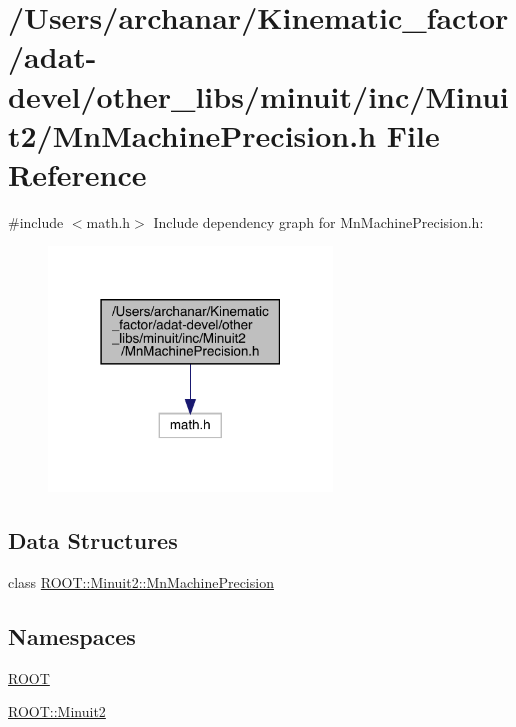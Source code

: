 \hypertarget{adat-devel_2other__libs_2minuit_2inc_2Minuit2_2MnMachinePrecision_8h}{}\section{/\+Users/archanar/\+Kinematic\+\_\+factor/adat-\/devel/other\+\_\+libs/minuit/inc/\+Minuit2/\+Mn\+Machine\+Precision.h File Reference}
\label{adat-devel_2other__libs_2minuit_2inc_2Minuit2_2MnMachinePrecision_8h}
{\ttfamily \#include $<$math.\+h$>$}\newline
Include dependency graph for Mn\+Machine\+Precision.\+h\+:
\nopagebreak
\begin{figure}[H]
\begin{center}
\leavevmode
\includegraphics[width=214pt]{d3/de6/adat-devel_2other__libs_2minuit_2inc_2Minuit2_2MnMachinePrecision_8h__incl}
\end{center}
\end{figure}
\subsection*{Data Structures}
\begin{DoxyCompactItemize}
\item 
class \mbox{\hyperlink{classROOT_1_1Minuit2_1_1MnMachinePrecision}{R\+O\+O\+T\+::\+Minuit2\+::\+Mn\+Machine\+Precision}}
\end{DoxyCompactItemize}
\subsection*{Namespaces}
\begin{DoxyCompactItemize}
\item 
 \mbox{\hyperlink{namespaceROOT}{R\+O\+OT}}
\item 
 \mbox{\hyperlink{namespaceROOT_1_1Minuit2}{R\+O\+O\+T\+::\+Minuit2}}
\end{DoxyCompactItemize}
